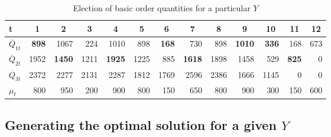 \begin{table}[bt!]
	\caption{Election of basic order quantities for a particular $Y$}
	\label{tab:Ybasicorder}
	\begin{tabular}{@{}lrrrrrrrrrrrr@{}}
		\toprule
		t        & \multicolumn{1}{c}{1} & \multicolumn{1}{c}{2} & \multicolumn{1}{c}{3} & \multicolumn{1}{c}{4} & \multicolumn{1}{c}{5} & \multicolumn{1}{c}{6} & \multicolumn{1}{c}{7} & \multicolumn{1}{c}{8} & \multicolumn{1}{c}{9} & \multicolumn{1}{c}{10} & \multicolumn{1}{c}{11} & \multicolumn{1}{c}{12} \\ \midrule
		$\overline Q_{1t}$ & \textbf{898}          & 1067                  & 224                   & 1010                  & 898                   & \textbf{168}          & 730                   & 898                   & \textbf{1010}         & \textbf{336}           & 168                    & 673                    \\
		$\overline Q_{2t}$ & 1952                  & \textbf{1450}         & 1211                  & \textbf{1925}         & 1225                  & 885                   & \textbf{1618}         & 1898                  & 1458                  & 529                    & \textbf{825}           & 0                      \\
		$\overline Q_{3t}$ & 2372                  & 2277                  & 2131                  & 2287                  & 1812                  & 1769                  & 2596                  & 2386                  & 1666                  & 1145                   & 0                      & 0                      \\ \midrule
		$\mu_t$  & 800                   & 950                   & 200                   & 900                   & 800                   & 150                   & 650                   & 800                   & 900                   & 300                    & 150                    & 600
	\end{tabular}
\end{table}

\subsection{Generating the optimal solution for a given $Y$}

